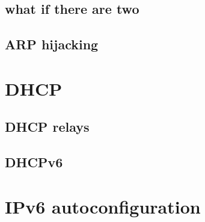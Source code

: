 

\subsection{what if there are two}



\subsection{ARP hijacking}




\section{DHCP}


\subsection{DHCP relays}


\subsection{DHCPv6}


\section{IPv6 autoconfiguration}


